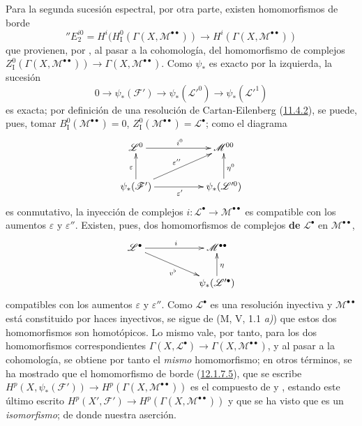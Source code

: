 \begin{env}[12.1.7]
Para la segunda sucesión espectral, por otra parte, existen homomorfismos
de borde
\[
\label{0.12.1.7.5-fr}
\tag{12.1.7.5}
''E_2^{i0}=H^i(H_{\mathrm I}^0(\Gamma(X,\mathcal M^{\bullet\bullet}))
\longrightarrow H^i(\Gamma(X,\mathcal M^{\bullet\bullet}))
\]
que provienen, por , al pasar a la cohomología, del
homomorfismo de complejos
$Z_{\mathrm I}^0(\Gamma(X,\mathcal M^{\bullet\bullet}))
\to\Gamma(X,\mathcal M^{\bullet\bullet})$.
Como $\psi_*$ es exacto por la izquierda, la sucesión
\[
0\longrightarrow\psi_*(\mathcal F')\longrightarrow
\psi_*(\mathcal L'^0)\longrightarrow\psi_*(\mathcal L'^1)
\]
es exacta; por definición de una resolución de Cartan-Eilenberg (\hyperref[0.11.4.2-fr]{11.4.2}), se puede, pues, tomar $B_{\mathrm I}^0(\mathcal M^{\bullet\bullet})=0$, $Z_{\mathrm I}^0(\mathcal M^{\bullet\bullet})=\mathcal L^\bullet$; como el diagrama
\[
\xymatrix@C=50pt@R=24pt{
\mathcal L^0\ar[r]^{i^0}&\mathcal M^{00}\\
\psi_*(\mathcal F')\ar[u]^\varepsilon
\ar[r]_{\varepsilon'}\ar[ur]^{\varepsilon''}
&\psi_*(\mathcal L'^0)\ar[u]_{\eta^0}
}
\]
es conmutativo, la inyección de complejos
$i:\mathcal L^\bullet\to\mathcal M^{\bullet\bullet}$ es compatible con los
aumentos $\varepsilon$ y $\varepsilon''$.
Existen, pues, dos homomorfismos de complejos \textbf{de} $\mathcal L^\bullet$
en $\mathcal M^{\bullet\bullet}$,
\[
\xymatrix@C=52pt@R=22pt{
\mathcal L^\bullet\ar[r]^i\ar[dr]_{v^\flat}
&\mathcal M^{\bullet\bullet}\\
&\psi_*(\mathcal L'^\bullet)\ar[u]_\eta
}
\]
compatibles con los aumentos $\varepsilon$ y
$\varepsilon''$.
Como $\mathcal L^\bullet$ es una resolución inyectiva y
$\mathcal M^{\bullet\bullet}$ está constituido por haces inyectivos, se sigue
de (M, V, 1.1 \textit{a)}) que estos dos homomorfismos son homotópicos.
Lo mismo vale, por tanto, para los dos homomorfismos correspondientes
$\Gamma(X,\mathcal L^\bullet)\to\Gamma(X,\mathcal M^{\bullet\bullet})$, y al pasar a la cohomología, se obtiene por tanto el \emph{mismo} homomorfismo; en otros términos, se ha mostrado que el homomorfismo de borde (\hyperref[0.12.1.7.5-fr]{12.1.7.5}), que se escribe $H^p(X,\psi_*(\mathcal F'))\to H^p(\Gamma(X,\mathcal M^{\bullet\bullet}))$
es el compuesto de  y
, estando este último escrito
$H^p(X',\mathcal F')\to H^p(\Gamma(X,\mathcal M^{\bullet\bullet}))$ y que se ha visto que es un \emph{isomorfismo}; de donde nuestra aserción.
\end{env}

